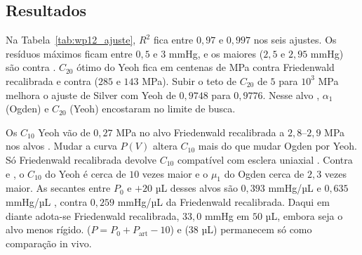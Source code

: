  
\subsection{Resultados}
 
Na Tabela~\ref{tab:wp12_ajuste}, $R^2$ fica entre $0{,}97$ e $0{,}997$ nos seis ajustes. Os resíduos máximos ficam entre $0{,}5$ e $3$ mmHg, e os maiores ($2{,}5$ e $2{,}95$ mmHg) são contra \citet{silvergeyer2000}. $C_{20}$ ótimo do Yeoh fica em centenas de MPa contra Friedenwald recalibrada e contra \citet{pallikaris2005} ($285$ e $143$ MPa). Subir o teto de $C_{20}$ de $5$ para $10^3$ MPa melhora o ajuste de Silver com Yeoh de $0{,}9748$ para $0{,}9776$. Nesse alvo \citep{silvergeyer2000}, $\alpha_1$ (Ogden) e $C_{20}$ (Yeoh) encostaram no limite de busca.

Os $C_{10}$ Yeoh vão de $0{,}27$ MPa no alvo Friedenwald recalibrada \citep{friedenwald1937,knecht2009} a $2{,}8$--$2{,}9$ MPa nos alvos \citep{pallikaris2005,silvergeyer2000}. Mudar a curva $P(V)$ altera $C_{10}$ mais do que mudar Ogden por Yeoh. Só Friedenwald recalibrada devolve $C_{10}$ compatível com esclera uniaxial \citep{park2021sclera}. Contra \citet{pallikaris2005} e \citet{silvergeyer2000}, o $C_{10}$ do Yeoh é cerca de $10$ vezes maior e o $\mu_1$ do Ogden cerca de $2{,}3$ vezes maior. As secantes entre $P_0$ e $+20$ µL desses alvos são $0{,}393$ mmHg/µL \citep{pallikaris2005} e $0{,}635$ mmHg/µL \citep{silvergeyer2000}, contra $0{,}259$ mmHg/µL da Friedenwald recalibrada. Daqui em diante adota-se Friedenwald recalibrada, $33{,}0$ mmHg em $50$ µL, embora seja o alvo menos rígido. \citet{pallikaris2005} ($P=P_0+P_{\mathrm{art}}-10$) e \citet{silvergeyer2000} ($38$ µL) permanecem só como comparação in vivo.


